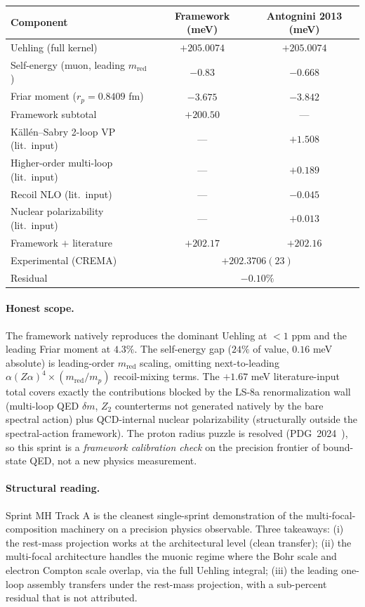 \documentclass[11pt]{article}
\begin{document}
\begin{tabular}{lcc}
\toprule
Component & Framework (meV) & Antognini 2013 (meV) \\
\midrule
Uehling (full kernel) & $+205.0074$ & $+205.0074$ \\
Self-energy (muon, leading $m_\text{red}$) & $-0.83$ & $-0.668$ \\
Friar moment ($r_p = 0.8409$ fm) & $-3.675$ & $-3.842$ \\
\midrule
Framework subtotal & $+200.50$ & --- \\
\midrule
K\"all\'en--Sabry 2-loop VP (lit.\ input) & --- & $+1.508$ \\
Higher-order multi-loop (lit.\ input) & --- & $+0.189$ \\
Recoil NLO (lit.\ input) & --- & $-0.045$ \\
Nuclear polarizability (lit.\ input) & --- & $+0.013$ \\
\midrule
Framework $+$ literature & $+202.17$ & $+202.16$ \\
\midrule
Experimental (CREMA) & \multicolumn{2}{c}{$+202.3706(23)$} \\
Residual & \multicolumn{2}{c}{$-0.10\%$} \\
\bottomrule
\end{tabular}

\paragraph{Honest scope.}  The framework natively reproduces the
dominant Uehling at $<1$ ppm and the leading Friar moment at $4.3\%$.
The self-energy gap ($24\%$ of value, $0.16$ meV absolute) is
leading-order $m_\text{red}$ scaling, omitting next-to-leading
$\alpha(Z\alpha)^4 \times (m_\text{red}/m_p)$ recoil-mixing terms.
The $+1.67$ meV literature-input total covers exactly the contributions
blocked by the LS-8a renormalization wall (multi-loop QED $\delta m$,
$Z_2$ counterterms not generated natively by the bare spectral action)
plus QCD-internal nuclear polarizability (structurally outside the
spectral-action framework).  The proton radius puzzle is resolved
(PDG~2024~\cite{pdg2024}), so this sprint is a \emph{framework calibration check} on
the precision frontier of bound-state QED, not a new physics
measurement.

\paragraph{Structural reading.}  Sprint MH Track A is the cleanest
single-sprint demonstration of the multi-focal-composition machinery
on a precision physics observable.  Three takeaways: (i) the rest-mass
projection works at the architectural level (clean transfer);
(ii) the multi-focal architecture handles the muonic regime where the
Bohr scale and electron Compton scale overlap, via the full Uehling
integral; (iii) the leading one-loop assembly transfers under the
rest-mass projection, with a sub-percent residual that is not
attributed.
\end{document}
